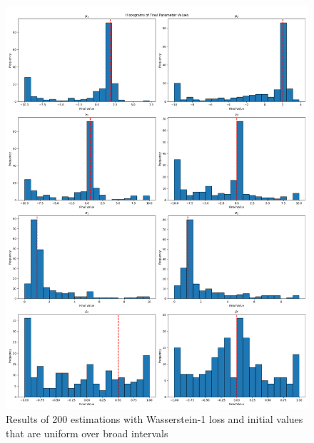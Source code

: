 \begin{figure}
    \includegraphics[width=\textwidth]{./Images/wide_uniform_histograms.png}
    \caption{Results of 200 estimations with Wasserstein-1 loss and initial values that are uniform over broad intervals}
    \label{fig:w1_wide_uniform_histograms}
\end{figure}


